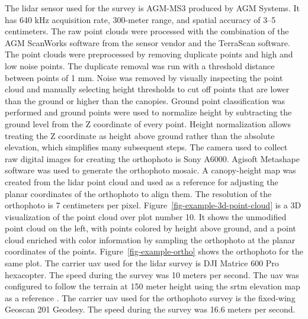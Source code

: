 The \gls{lidar} sensor used for the survey is AGM-MS3 produced by AGM Systems.
It has 640 kHz acquisition rate, 300-meter range, and spatial accuracy of 3–5 centimeters.
The raw point clouds were processed with the combination of the AGM ScanWorks software from the sensor vendor and the TerraScan software.
The point clouds were preprocessed by removing duplicate points and high and low noise points.
The duplicate removal was run with a threshold distance between points of 1 mm.
Noise was removed by visually inspecting the point cloud and manually selecting height thresholds to cut off points that are lower than the ground or higher than the canopies.
Ground point classification was performed and ground points were used to normalize height by subtracting the ground level from the Z coordinate of every point.
Height normalization allows treating the Z coordinate as height above ground rather than the absolute elevation, which simplifies many subsequent steps.
The camera used to collect raw digital images for creating the orthophoto is Sony A6000.
Agisoft Metashape software was used to generate the orthophoto mosaic.
A canopy-height map was created from the \gls{lidar} point cloud and used as a reference for adjusting the planar coordinates of the orthophoto to align them.
The resolution of the orthophoto is 7 centimeters per pixel.
Figure~\ref{fig-example-3d-point-cloud} is a 3D visualization of the point cloud over plot number 10.
It shows the unmodified point cloud on the left, with points colored by height above ground, and a point cloud enriched with color information by sampling the orthophoto at the planar coordinates of the points.
Figure~\ref{fig-example-ortho} shows the orthophoto for the same plot.
The carrier \gls{uav} used for the \gls{lidar} survey is DJI Matrice 600 Pro hexacopter.
The speed during the survey was 10 meters per second.
The \gls{uav} was configured to follow the terrain at 150 meter height using the \gls{srtm} elevation map as a reference \citep{farrShuttleRadarTopography2000}.
The carrier \gls{uav} used for the orthophoto survey is the fixed-wing Geoscan 201 Geodesy.
The speed during the survey was 16.6 meters per second.

